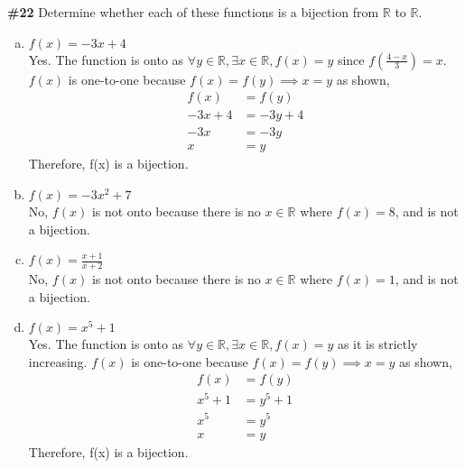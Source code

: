 \documentclass{article}
\newcommand{\problem}[1]{\textbf{\##1}}
\newcommand{\prob}[1]{\problem{#1}}
\newcommand{\AllReals}{\mathbb{R}}
\begin{document}
\pagebreak

\prob{22} Determine whether each of these functions is a bijection
from \(\AllReals\) to \(\AllReals\).
\begin{enumerate}[a)]
    \item \(f(x) = -3x+4\)\\
    Yes. The function is onto as \(\forall y \in \AllReals, \exists x \in \AllReals, f(x) = y\) since \(f(\frac{4-x}{3}) = x\). \(f(x)\) is one-to-one because \(f(x) = f(y) \implies x = y\) as shown,
    \begin{align*}
        f(x) &= f(y)\\
        -3x+4 &= -3y+4\\
        -3x &= -3y\\
        x &= y
    \end{align*}
    Therefore, f(x) is a bijection.
    \item \(f(x) = -3x^2+7\)\\
    No, \(f(x)\) is not onto because there is no \(x\in\AllReals\) where \(f(x) = 8\), and is not a bijection.
    \item \(f(x) = \frac{x+1}{x+2}\)\\
    No, \(f(x)\) is not onto because there is no \(x\in\AllReals\) where \(f(x) = 1\), and is not a bijection.
    \item \(f(x) = x^5+1\)\\
    Yes. The function is onto as \(\forall y \in \AllReals, \exists x \in \AllReals, f(x) = y\) as it is strictly increasing. \(f(x)\) is one-to-one because \(f(x) = f(y) \implies x = y\) as shown,
    \begin{align*}
        f(x) &= f(y)\\
        x^5+1 &= y^5+1\\
        x^5 &= y^5\\
        x &= y
    \end{align*}
    Therefore, f(x) is a bijection.
\end{enumerate}
\pagebreak
\end{document}

